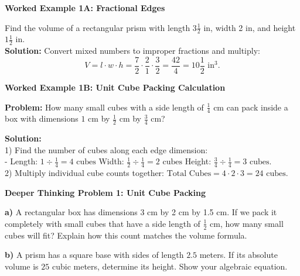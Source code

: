 \documentclass[12pt, letterpaper, fleqn]{article}
\begin{document}
\vspace{2mm}

\begin{tcolorbox}[colback=white, colframe=black!25, boxrule=0.6pt, arc=4mm, left=6mm, right=6mm, top=4mm, bottom=4mm]
\textbf{Worked Example 1A: Fractional Edges}

\medskip
\noindent
Find the volume of a rectangular prism with length $3\frac{1}{2}$ in, width 2 in, and height $1\frac{1}{2}$ in.\\
\textbf{Solution:} Convert mixed numbers to improper fractions and multiply:
$$V = l \cdot w \cdot h = \frac{7}{2} \cdot \frac{2}{1} \cdot \frac{3}{2} = \frac{42}{4} = 10\frac{1}{2}\text{ in}^3.$$
\end{tcolorbox}

\vspace{3mm}

\begin{tcolorbox}[colback=white, colframe=black!25, boxrule=0.6pt, arc=4mm, left=6mm, right=6mm, top=4mm, bottom=4mm]
\textbf{Worked Example 1B: Unit Cube Packing Calculation}

\medskip
\noindent
\textbf{Problem:} How many small cubes with a side length of $\frac{1}{4}$ cm can pack inside a box with dimensions $1$ cm by $\frac{1}{2}$ cm by $\frac{3}{4}$ cm?

\medskip
\noindent
\textbf{Solution:} \\
1) Find the number of cubes along each edge dimension:\\
- Length: $1 \div \frac{1}{4} = 4\text{ cubes}$ \quad Width: $\frac{1}{2} \div \frac{1}{4} = 2\text{ cubes}$ \quad Height: $\frac{3}{4} \div \frac{1}{4} = 3\text{ cubes}$.\\
2) Multiply individual cube counts together: $\text{Total Cubes} = 4 \cdot 2 \cdot 3 = 24\text{ cubes}$.
\end{tcolorbox}

\newpage

\begin{tcolorbox}[colback=white, colframe=black, boxrule=1pt, arc=4mm, left=6mm, right=6mm, top=5mm, bottom=5mm]
\textbf{Deeper Thinking Problem 1: Unit Cube Packing}

\medskip
\noindent
\textbf{a)} A rectangular box has dimensions 3 cm by 2 cm by 1.5 cm. If we pack it completely with small cubes that have a side length of $\frac{1}{2}$ cm, how many small cubes will fit? Explain how this count matches the volume formula.
\vspace{3cm}

\noindent
\textbf{b)} A prism has a square base with sides of length $2.5$ meters. If its absolute volume is $25$ cubic meters, determine its height. Show your algebraic equation.
\vspace{2.5cm}
\end{tcolorbox}
\end{document}
